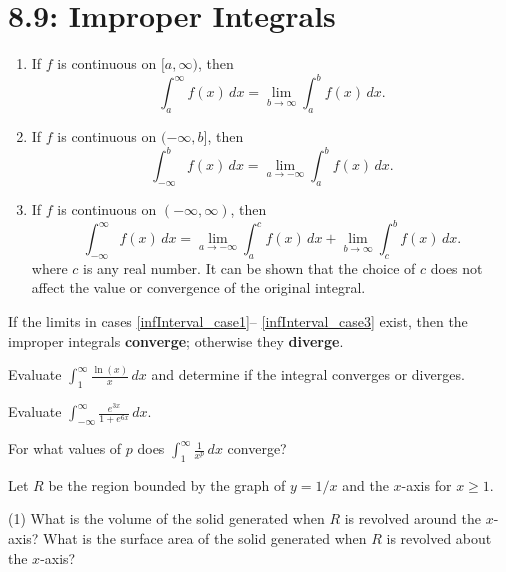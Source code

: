\documentclass[../mathNotesPreamble]{subfiles}
\begin{document}
  \section{8.9: Improper Integrals}
    \begin{defn*}
      \begin{enumerate}
        \item \label{infInterval_case1} If $f$ is continuous on $[a,\infty)$, then
          \[\int_a^\infty f(x)\,dx=\lim_{b\to \infty} \int_a^b f(x)\,dx.\]
        \item \label{infInterval_case2} If $f$ is continuous on $(-\infty,b]$, then
          \[\int_{-\infty}^b f(x)\,dx=\lim_{a\to -\infty} \int_a^b f(x)\,dx.\]
        \item \label{infInterval_case3} If $f$ is continuous on $(-\infty,\infty)$, then
          \[\int_{-\infty}^\infty f(x)\,dx=\lim_{a\to-\infty}\int_a^c f(x)\,dx+\lim_{b\to\infty}\int_c^b f(x)\,dx.\]
          where $c$ is any real number. It can be shown that the choice of $c$ does not affect the value or convergence of the original integral.
      \end{enumerate}
      If the limits in cases \ref{infInterval_case1}-- \ref{infInterval_case3} exist, then the improper integrals \textbf{converge}; otherwise they \textbf{diverge}.
    \end{defn*}

    \begin{ex*}
      Evaluate $\displaystyle \int_1^\infty \frac{\ln(x)}{x}\,dx$ and determine if the integral converges or diverges.
    \end{ex*}
    \pagebreak

    \begin{ex*}
      Evaluate $\displaystyle \int_{-\infty}^{\infty} \frac{e^{3x}}{1+e^{6x}}\,dx$.
    \end{ex*}
    \pagebreak

    \begin{ex*}
      For what values of $p$ does $\displaystyle \int_1^\infty \frac{1}{x^p}\,dx$ converge?
    \end{ex*}
    \pagebreak

    \begin{ex*}
      Let $R$ be the region bounded by the graph of $y=1/x$ and the $x$-axis for $x\geq 1$. 
    \end{ex*}
    \begin{tasks}[after-item-skip=\stretch{1}, label=, item-indent=0pt](1)
      \task What is the volume of the solid generated when $R$ is revolved around the $x$-axis?
      \task What is the surface area of the solid generated when $R$ is revolved about the $x$-axis?
    \end{tasks}
    \pagebreak
\end{document}
